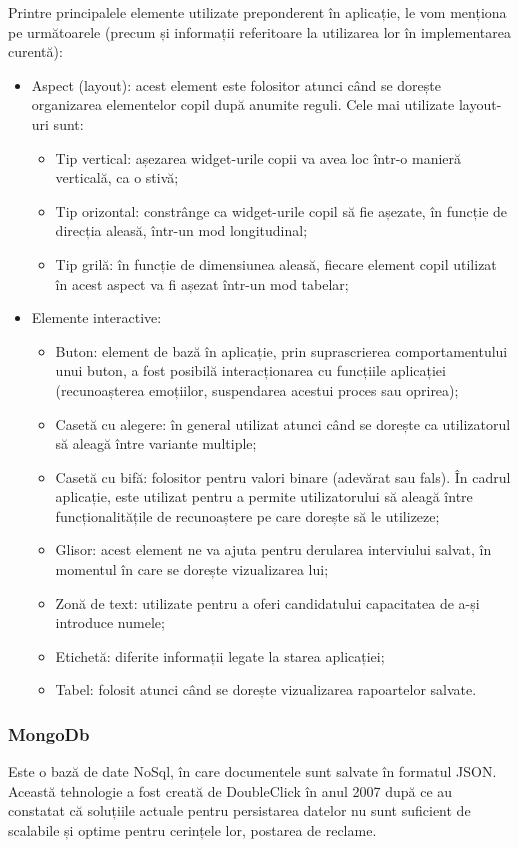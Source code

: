 \documentclass[a4paper, 12pt]{report}
\begin{document}
	Printre principalele elemente utilizate preponderent în aplicație, le vom menționa pe următoarele (precum și informații referitoare la utilizarea lor în implementarea curentă):
	\begin{itemize}
		\item Aspect (layout): acest element este folositor atunci când se dorește organizarea elementelor copil după anumite reguli. Cele mai utilizate layout-uri sunt:
		\begin{itemize}
			\item Tip vertical: așezarea widget-urile copii va avea loc într-o manieră verticală, ca o stivă;
			\item Tip orizontal: constrânge ca widget-urile copil să fie așezate, în funcție de direcția aleasă, într-un mod longitudinal;
			\item Tip grilă: în funcție de dimensiunea aleasă, fiecare element copil utilizat în acest aspect va fi așezat într-un mod tabelar;
		\end{itemize}
		\item Elemente interactive:
		\begin{itemize}
			\item Buton: element de bază în aplicație, prin suprascrierea comportamentului unui buton, a fost posibilă interacționarea cu funcțiile aplicației (recunoașterea emoțiilor, suspendarea acestui proces sau oprirea);
			\item Casetă cu alegere: în general utilizat atunci când se dorește ca utilizatorul să aleagă între variante multiple;
			\item Casetă cu bifă: folositor pentru valori binare (adevărat sau fals). În cadrul aplicație, este utilizat pentru a permite utilizatorului să aleagă între funcționalitățile de recunoaștere pe care dorește să le utilizeze;
			\item Glisor: acest element ne va ajuta pentru derularea interviului salvat, în momentul în care se dorește vizualizarea lui;
			\item Zonă de text: utilizate pentru a oferi candidatului capacitatea de a-și introduce numele;
			\item Etichetă: diferite informații legate la starea aplicației;
			\item Tabel: folosit atunci când se dorește vizualizarea rapoartelor salvate.
		\end{itemize}
	\end{itemize}
	
	\subsubsection{MongoDb}
	Este o bază de date NoSql, în care documentele sunt salvate în formatul JSON. Această tehnologie a fost creată de DoubleClick în anul 2007 după ce au constatat că soluțiile actuale pentru persistarea datelor nu sunt suficient de scalabile și optime pentru cerințele lor, postarea de reclame. 
	
\end{document}
